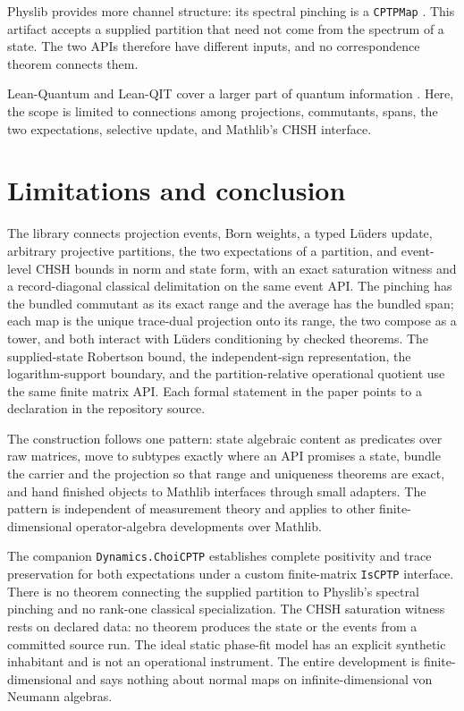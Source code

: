 \documentclass[11pt]{article}
\renewcommand{\_}{\textunderscore\allowbreak}
\theoremstyle{remark}
\begin{document}
Physlib provides more channel structure: its spectral pinching is a
\texttt{CPTPMap} \cite{physlibPinching2026}. This artifact accepts a supplied
partition that need not come from the spectrum of a state. The two APIs
therefore have different inputs, and no correspondence theorem connects them.

Lean-Quantum and Lean-QIT cover a larger part of quantum information
\cite{kasauraEtAl2026LeanQuantum,zhuEtAl2026LeanQIT}. Here, the scope is
limited to connections among projections, commutants, spans, the two
expectations, selective update, and Mathlib's CHSH interface.

\section{Limitations and conclusion}
\label{sec:conclusion}

The library connects projection events, Born weights, a typed L\"uders
update, arbitrary projective partitions, the two expectations of a partition,
and event-level CHSH bounds in norm and state form, with an exact saturation
witness and a record-diagonal classical delimitation on the same event API. The pinching has the
bundled commutant as its exact range and the average has the bundled span;
each map is the unique trace-dual projection onto its range, the two compose
as a tower, and both interact with L\"uders conditioning by checked
theorems. The supplied-state Robertson bound, the independent-sign
representation, the logarithm-support boundary, and the partition-relative
operational quotient use the same finite matrix API. Each formal statement
in the paper points to a declaration in the repository source.

The construction follows one pattern: state algebraic content as predicates
over raw matrices, move to subtypes exactly where an API promises a state,
bundle the carrier and the projection so that range and uniqueness theorems
are exact, and hand finished objects to Mathlib interfaces through small
adapters. The pattern is independent of measurement theory and applies to
other finite-dimensional operator-algebra developments over Mathlib.

The companion \texttt{Dynamics.ChoiCPTP} establishes complete positivity
and trace preservation for both expectations under a custom finite-matrix
\texttt{IsCPTP} interface. There is no theorem connecting the supplied
partition to Physlib's spectral pinching and no rank-one classical
specialization. The CHSH saturation witness rests on declared data: no
theorem produces the state or the events from a committed source run. The
ideal static phase-fit model has an explicit synthetic inhabitant and is not
an operational instrument. The entire
development is finite-dimensional and says nothing about normal maps on
infinite-dimensional von Neumann algebras.
\end{document}
